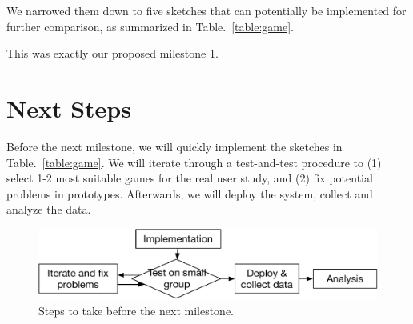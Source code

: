 \documentclass{article}
\begin{document}
We narrowed them down to five sketches that can potentially be implemented for further comparison, as summarized in Table.~\ref{table:game}.

This was exactly our proposed milestone 1.


\section{Next Steps}

Before the next milestone, we will quickly implement the sketches in Table.~\ref{table:game}. 
We will iterate through a test-and-test procedure to (1) select 1-2 most suitable games for the real user study, and (2) fix potential problems in prototypes. 
Afterwards, we will deploy the system, collect and analyze the data.

\begin{figure}[htb]
  \centering
  \vspace{-3mm}
	\includegraphics[width=0.9\columnwidth]{workflow}
  \vspace{-3mm}
  \caption{
	Steps to take before the next milestone.}
  \label{fig:workflow}  
  \vspace{-3mm}
\end{figure}

\end{document}
